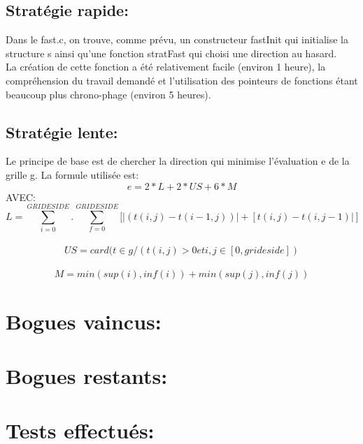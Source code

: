 \documentclass{report}
\begin{document}
\subsection*{Stratégie rapide:}
\begin{description}
Dans le fast.c, on trouve, comme prévu, un constructeur fastInit qui initialise la structure s ainsi qu'une fonction stratFast qui choisi une direction au hasard.\\
La création de cette fonction a été relativement facile (environ 1 heure), la compréhension du travail demandé et l'utilisation des pointeurs de fonctions étant beaucoup plus chrono-phage (environ 5 heures).
\end{description}

\subsection*{Stratégie lente:}
\begin{description}
Le principe de base est de chercher la direction qui minimise l'évaluation e de la grille g. La formule utilisée est:
$$ e=2*L+2*US+6*M$$
AVEC:
$$ L=\sum_{i=0}^{GRIDESIDE} .^{ } \sum_{f=0}^{GRIDESIDE}[|(t(i,j)-t(i-1,j))|+[t(i,j)-t(i,j-1)|]$$
\\
$$ US=card(t \in g / (t(i,j)>0 et i,j \in [0,grideside]) $$
\\
$$M=min(sup(i),inf(i)) + min(sup(j),inf(j))$$

\end{description}

\section*{Bogues vaincus:}
\begin{description}

\end{description}
\section*{Bogues restants:}
\begin{description}

\end{description}
\section*{Tests effectués:}
\end{document}
